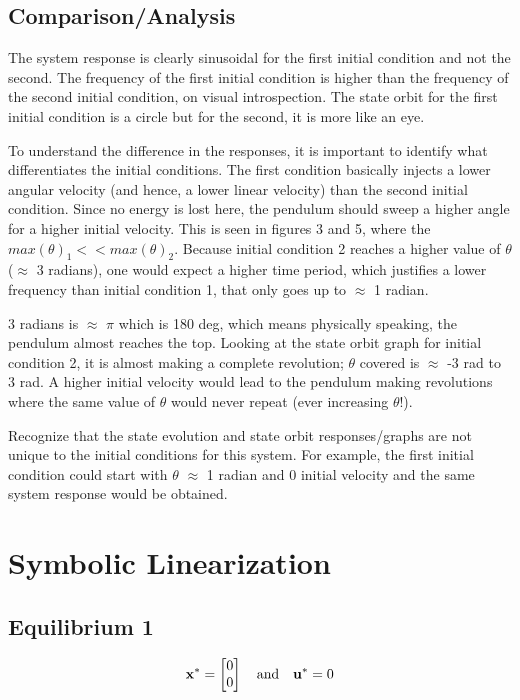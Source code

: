 \documentclass[10pt]{article}
\begin{document}
\subsection{Comparison/Analysis}
    The system response is clearly sinusoidal for the first initial condition and not the second. The frequency of the first initial condition is higher than the frequency of the second initial condition, on visual introspection. The state orbit for the first initial condition is a circle but for the second, it is more like an eye. 
    
    To understand the difference in the responses, it is important to identify what differentiates the initial conditions. The first condition basically injects a lower angular velocity (and hence, a lower linear velocity) than the second initial condition. Since no energy is lost here, the pendulum should sweep a higher angle for a higher initial velocity. This is seen in figures 3 and 5, where the \begin{math}
     max(\theta)_1 << max(\theta)_2
    \end{math}. Because initial condition 2 reaches a higher value of $\theta$ ($\approx$ 3 radians), one would expect a higher time period, which justifies a lower frequency than initial condition 1, that only goes up to $\approx$ 1 radian. 
    
    3 radians is $\approx$ $\pi$ which is 180 deg, which means physically speaking, the pendulum almost reaches the top. Looking at the state orbit graph for initial condition 2, it is almost making a complete revolution; $\theta$ covered is $\approx$ -3 rad to 3 rad. A higher initial velocity would lead to the pendulum making revolutions where the same value of $\theta$ would never repeat (ever increasing $\theta$!). 
    
    Recognize that the state evolution and state orbit responses/graphs are not unique to the initial conditions for this system. For example, the first initial condition could start with $\theta$ $\approx$ 1 radian and 0 initial velocity and the same system response would be obtained. 
    

\section{Symbolic Linearization}

\subsection{Equilibrium 1}
    \begin{equation}
         \mathbf{x}^* = \begin{bmatrix} 0\\0 \end{bmatrix}
         \quad
         \text{and}
         \quad
         \mathbf{u}^* = 0
    \end{equation}
\end{document}
